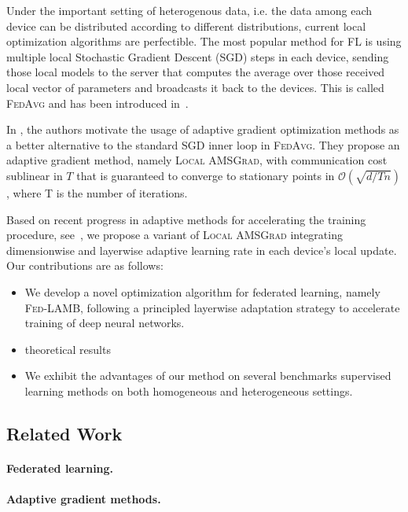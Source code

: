 \documentclass{article}
\begin{document}
Under the important setting of heterogenous data, i.e. the data among each device can be distributed according to different distributions, current local optimization algorithms are perfectible.
The most popular method for FL is using multiple local Stochastic Gradient Descent (\textsc{SGD}) steps in each device, sending those local models to the server that computes the average over those received local vector of parameters and broadcasts it back to the devices. This is called \textsc{FedAvg} and has been introduced in~\citep{mcmahan2017communication}.

In \citep{chen2020toward}, the authors motivate the usage of adaptive gradient optimization methods as a better alternative to the standard \textsc{SGD} inner loop in \textsc{FedAvg}.
They propose an adaptive gradient method, namely \textsc{Local AMSGrad}, with communication cost sublinear in $T$ that is guaranteed to converge to stationary points in $\mathcal{O}(\sqrt{d/Tn})$, where T is the number of iterations.

Based on recent progress in adaptive methods for accelerating the training procedure, see~\citep{you2019large}, we propose a variant of \textsc{Local AMSGrad} integrating dimensionwise and layerwise adaptive learning rate in each device's local update.
Our contributions are as follows:
\begin{itemize}
\item We develop a novel optimization algorithm for federated learning, namely \textsc{Fed-LAMB}, following a principled layerwise adaptation strategy to accelerate training of deep neural networks.
\item theoretical results
\item We exhibit the advantages of our method on several benchmarks supervised learning methods on both homogeneous and heterogeneous settings.
\end{itemize}

\subsection{Related Work}\label{sec:related}

\paragraph{Federated learning.}



\paragraph{Adaptive gradient methods.}
\end{document}
